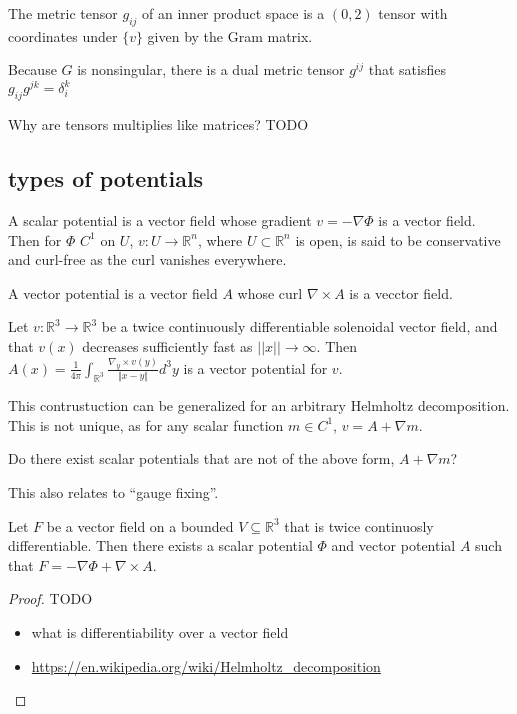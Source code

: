 \documentclass[12pt,letterpaper,titlepage,twoside]{article}
\begin{document}
\begin{definition}
The metric tensor $g_{ij}$ of an inner product space is a $(0,2)$ tensor with coordinates under $\{v\}$ given by the Gram matrix.
\end{definition}

Because $G$ is nonsingular, there is a dual metric tensor $g^{ij}$ that satisfies $g_{ij}g^{jk}=δ_i^k$

Why are tensors multiplies like matrices? TODO


\subsection{types of potentials}

\begin{definition}
A scalar potential is a vector field whose gradient $v=-∇ Φ$ is a vector field. 
Then for $Φ$ $C^1$ on $U$, $v:U→ ℝ ^n$, where $U⊂ ℝ ^n$ is open, is said to be conservative and curl-free as the curl vanishes everywhere.
\end{definition}

\begin{definition}
A vector potential is a vector field $A$ whose curl $∇ ×A$ is a vecctor field.
\end{definition}

\begin{theorem}
Let $v:ℝ ^3→ ℝ ^3$ be a twice continuously differentiable solenoidal vector field, and that $v(x)$ decreases sufficiently fast as $||x||→ ∞$.
Then $A(x)=\frac{1}{4π}∫_{ℝ ^3} \frac{∇ _y×v(y)}{\Vert x-y\Vert}d^3y$
is a vector potential for $v$.
\end{theorem}

This contrustuction can be generalized for an arbitrary Helmholtz decomposition.
This is not unique, as for any scalar function $m∈ C^1$, $v=A+∇ m$.

\begin{question}
Do there exist scalar potentials that are not of the above form, $A+∇ m$?
\end{question}

This also relates to ``gauge fixing''.

\begin{theorem}
Let $F$ be a vector field on a bounded $V⊆ ℝ ^3$ that is twice continuosly differentiable.
Then there exists a scalar potential $Φ$ and vector potential $A$ such that $F=-∇ Φ+∇ × A$.
\end{theorem}
\begin{proof}
TODO
\begin{itemize}
  \item what is differentiability over a vector field
  \item \url{https://en.wikipedia.org/wiki/Helmholtz_decomposition}
\end{itemize}
\end{proof}
\end{document}

